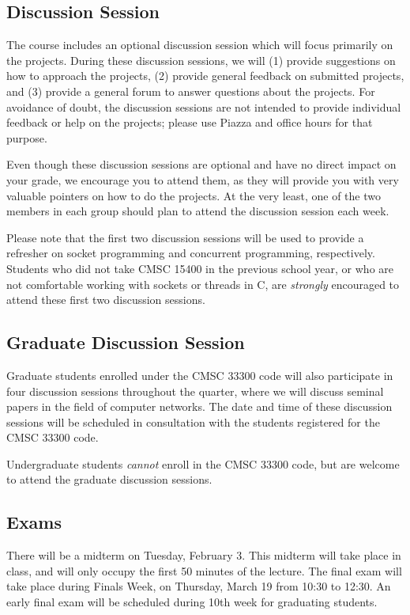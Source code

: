 \documentclass[11pt]{article}
\begin{document}
\subsection{Discussion Session}

The course includes an optional discussion session which will focus primarily on the projects. During these discussion sessions, we will (1) provide suggestions on how to approach the projects, (2) provide general feedback on submitted projects, and (3) provide a general forum to answer questions about the projects. For avoidance of doubt, the discussion sessions are not intended to provide individual feedback or help on the projects; please use Piazza and office hours for that purpose.

Even though these discussion sessions are optional and have no direct impact on your grade, we encourage you to attend them, as they will provide you with very valuable pointers on how to do the projects. At the very least, one of the two members in each group should plan to attend the discussion session each week.

Please note that the first two discussion sessions will be used to provide a refresher on socket programming and concurrent programming, respectively. Students who did not take CMSC 15400 in the previous school year, or who are not comfortable working with sockets or threads in C, are \emph{strongly} encouraged to attend these first two discussion sessions.


\subsection{Graduate Discussion Session}

Graduate students enrolled under the CMSC 33300 code will also participate in four discussion sessions throughout the quarter, where we will discuss seminal papers in the field of computer networks. The date and time of these discussion sessions will be scheduled in consultation with the students registered for the CMSC 33300 code.

Undergraduate students \emph{cannot} enroll in the CMSC 33300 code, but are welcome to attend the graduate discussion sessions.

\subsection{Exams}

There will be a midterm on Tuesday, February 3. This midterm will take place in class, and will only occupy the first 50 minutes of the lecture. The final exam will take place during Finals Week, on Thursday, March 19 from 10:30 to 12:30. An early final exam will be scheduled during 10th week for graduating students.
\end{document}
